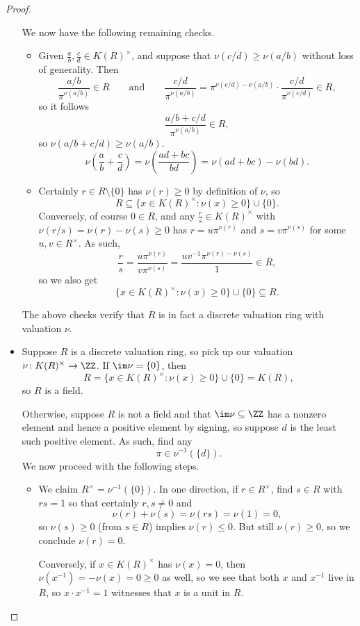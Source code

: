 \documentclass[../notes.tex]{subfiles}
\begin{document}
\begin{proof}
\begin{itemize}
		We now have the following remaining checks.
		\begin{itemize}
			\item Given $\frac ab,\frac cd\in K(R)^\times$, and suppose that $\nu(c/d)\ge\nu(a/b)$ without loss of generality. Then
			\[\frac{a/b}{\pi^{\nu(a/b)}}\in R\qquad\text{and}\qquad\frac{c/d}{\pi^{\nu(a/b)}}=\pi^{\nu(c/d)-\nu(a/b)}\cdot\frac{c/d}{\pi^{\nu(c/d)}}\in R,\]
			so it follows
			\[\frac{a/b+c/d}{\pi^{\nu(a/b)}}\in R,\]
			so $\nu(a/b+c/d)\ge\nu(a/b)$.
			\[\nu\left(\frac ab+\frac cd\right)=\nu\left(\frac{ad+bc}{bd}\right)=\nu(ad+bc)-\nu(bd).\]
			\item Certainly $r\in R\setminus\{0\}$ has $\nu(r)\ge0$ by definition of $\nu$, so
			\[R\subseteq\{x\in K(R)^\times:\nu(x)\ge0\}\cup\{0\}.\]
			Conversely, of course $0\in R$, and any $\frac rs\in K(R)^\times$ with $\nu(r/s)=\nu(r)-\nu(s)\ge0$ has $r=u\pi^{\nu(r)}$ and $s=v\pi^{\nu(s)}$ for some $u,v\in R^\times$. As such,
			\[\frac rs=\frac{u\pi^{\nu(r)}}{v\pi^{\nu(s)}}=\frac{uv^{-1}\pi^{\nu(r)-\nu(s)}}1\in R,\]
			so we also get
			\[\{x\in K(R)^\times:\nu(x)\ge0\}\cup\{0\}\subseteq R.\]
		\end{itemize}
		The above checks verify that $R$ is in fact a discrete valuation ring with valuation $\nu$.

		\item Suppose $R$ is a discrete valuation ring, so pick up our valuation $\nu\colon K(R)^\times\to\ZZ$. If $\im\nu=\{0\}$, then
		\[R=\{x\in K(R)^\times:\nu(x)\ge0\}\cup\{0\}=K(R),\]
		so $R$ is a field.

		Otherwise, suppose $R$ is not a field and that $\im\nu\subseteq\ZZ$ has a nonzero element and hence a positive element by signing, so suppose $d$ is the least such positive element. As such, find any
		\[\pi\in\nu^{-1}(\{d\}).\]
		We now proceed with the following steps.
		\begin{itemize}
			\item We claim $R^\times=\nu^{-1}(\{0\})$. In one direction, if $r\in R^\times$, find $s\in R$ with $rs=1$ so that certainly $r,s\ne0$ and
			\[\nu(r)+\nu(s)=\nu(rs)=\nu(1)=0,\]
			so $\nu(s)\ge0$ (from $s\in R$) implies $\nu(r)\le0$. But still $\nu(r)\ge0$, so we conclude $\nu(r)=0$.

			Conversely, if $x\in K(R)^\times$ has $\nu(x)=0$, then $\nu\left(x^{-1}\right)=-\nu(x)=0\ge0$ as well, so we see that both $x$ and $x^{-1}$ live in $R$, so $x\cdot x^{-1}=1$ witnesses that $x$ is a unit in $R$.
			

\end{itemize}
\end{itemize}
\end{proof}
\end{document}
